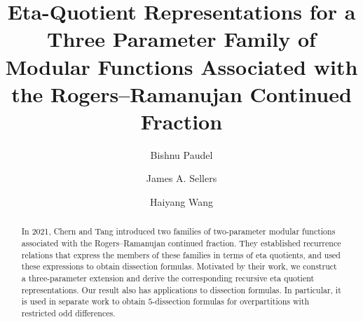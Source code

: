 \documentclass{amsart}
\theoremstyle{definition}
\begin{document}
\title[Rogers--Ramanujan Continued Fraction]
{Eta-Quotient Representations for a {Three Parameter} Family of Modular Functions Associated with the Rogers--Ramanujan Continued Fraction}

\author[B. Paudel]{Bishnu Paudel}

\author[J. Sellers]{James A. Sellers}

\author[H. Wang]{Haiyang Wang}

\address{Mathematics and Statistics Department\\
University of Minnesota Duluth\\
Duluth, MN 55812, USA}




\begin{abstract}
In 2021, Chern and Tang introduced two families of two-parameter modular
functions associated with the Rogers--Ramanujan continued fraction.  They established recurrence relations that express the
members of these families in terms of eta quotients, and used these expressions to
obtain dissection formulas.
Motivated by their work, we construct a three-parameter
extension and derive the corresponding recursive eta quotient
representations. Our result also has applications to dissection formulas. In particular,
it is used in separate work to obtain $5$-dissection formulas for overpartitions with restricted odd differences.
\end{abstract}

\maketitle
\end{document}

